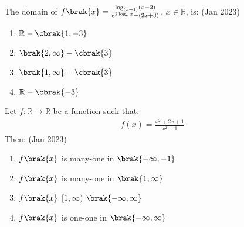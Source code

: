 
\iffalse
\title{assignment}
\author{EE24BTECH11020}
\section{mcq-single}
\fi

\item The domain of $f\brak{x} = \frac{\log_{(x+1)}(x-2)}{e^{2 \log_e x} - (2x + 3)} $, $ x \in \mathbb{R} $, is: \hfill(Jan 2023)
\begin{multicols}{4}
    \begin{enumerate}
    \item $\mathbb{R} - \cbrak{1,-3}$ 
    \item $\brak{2,\infty} - \cbrak{3}$ 
     \item $\brak{1,\infty} - \cbrak{3}$ 
    \item $\mathbb{R} - \cbrak{-3}$ 
\end{enumerate}
\end{multicols}


\item Let $f:\mathbb{R} \to \mathbb{R} $ be a function such that:
   \begin{align*}
        f(x) = \frac{x^2 + 2x + 1}{x^{2} + 1}
   \end{align*}
   Then: \hfill(Jan 2023)
   \begin{enumerate}
       \item $f\brak{x}$  is many-one in  $\brak{-\infty, -1}$
       \item $f\brak{x}$  is many-one in  $\brak{1,\infty}$
       \item $f\brak{x}$  $[1 ,\infty) $  $\brak{-\infty, \infty}$

       
       \item $ f\brak{x}$  is one-one in  $\brak{-\infty, \infty}$
   \end{enumerate}

